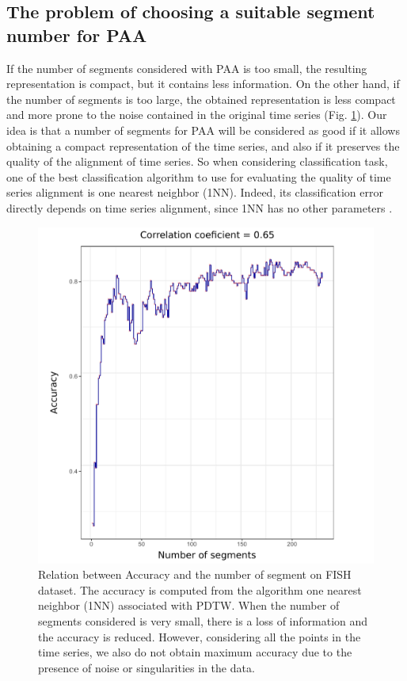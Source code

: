 \subsection{The problem of choosing a suitable segment number for PAA}

If the number of segments considered with PAA is too small, the resulting
representation  is compact, but it contains less information. On the other hand, if the number of
segments is too large, the obtained representation  is less compact and more prone to the noise
contained in the original time series (Fig. \ref{relation_nb_acc}). Our idea is that a number of
segments for PAA will be considered as good if it allows obtaining a compact representation of the
time series, and also if it preserves the quality of the alignment of time series. So when
considering classification task, one of the best classification algorithm to use for
evaluating the quality of time series alignment is one nearest neighbor (1NN).   
Indeed, its classification error directly depends on time series alignment, since 1NN has no other
parameters \cite{wang2013experimental}.


\begin{figure}[h]
\center
\includegraphics[scale = 0.4]{images/effets_de_n_sur_accuracy}
\caption{Relation between Accuracy and the number of segment on FISH dataset. The accuracy is computed from the algorithm one nearest neighbor (1NN) associated with PDTW. When the number of segments
considered is very small, there is a loss of information and the accuracy is reduced. However, considering all the points in the time series, we also do not obtain maximum accuracy due to the presence of noise or singularities \cite{Keogh_Pazzani_2001}  in the data. }
\label{relation_nb_acc}
\end{figure}


